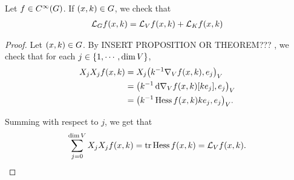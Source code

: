\begin{proposition}
    Let $f \in \SmoothFunctions\Group$.
    If $(x, k) \in \Group$, we check that
    \begin{align*}
        \Laplacian f(x, k) = \Laplacian[\VectorSpace] f(x, k) + \Laplacian[\CompactGroup] f(x, k)
    \end{align*}
\end{proposition}
\begin{proof}
    Let $(x, k) \in \Group$.
    By INSERT PROPOSITION OR THEOREM??? ,
    we check that for each $j \in \{1, \cdots, \dim \VectorSpace\}$,
    \begin{align*}
        \LeftDifferentialOperatorFirstOrder{X_j} \LeftDifferentialOperatorFirstOrder{X_j} f(x, k)
        &= \LeftDifferentialOperatorFirstOrder{X_j} \ip{k^{-1} \grad f(x, k)}{e_j}\\
        &= \ip{k^{-1} \dd \grad f(x, k)[k e_j]}{e_j}\\
        &= \ip{k^{-1} \Hessian f(x, k) k e_j}{e_j}.
    \end{align*}

    Summing with respect to $j$, we get that
    \begin{align*}
        \sum_{j = 0}^{\dim \VectorSpace} \LeftDifferentialOperatorFirstOrder{X_j} \LeftDifferentialOperatorFirstOrder{X_j} f(x, k)
        = \tr \Hessian f(x, k) = \Laplacian[\VectorSpace] f(x, k).
    \end{align*}
\end{proof}

